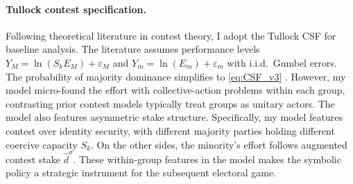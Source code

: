 \documentclass[11pt,twoside]{extarticle}
\begin{document}





\paragraph{Tullock contest specification.} 
Following theoretical literature in contest theory, I adopt the Tullock CSF for baseline analysis. The literature assumes performance levels $Y_M=\ln(S_kE_M)+\varepsilon_M$ and $Y_m=\ln(E_m)+\varepsilon_m$ with i.i.d.\ Gumbel errors. The probability of majority dominance simplifies to \eqref{eq:CSF_v3} \citep*{skaperdasContestSuccessFunctions1996,jiaStochasticDerivationRatio2008}. However, my model micro-found the effort with collective-action problems within each group, contrasting prior contest models typically treat groups as unitary actors. The model also features asymmetric stake structure. Specifically, my model features contest over identity security, with different majority parties holding different coercive capacity $S_k$. On the other sides, the minority's effort follows augmented contest stake $\hat d^\sigma$. These within-group features in the model makes the symbolic policy a strategic instrument for the subsequent electoral game.
\end{document}
